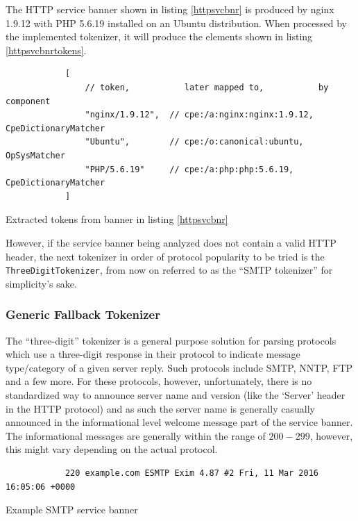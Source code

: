 \documentclass[a4paper,12pt]{article}
\begin{document}
	The HTTP service banner shown in listing \ref{httpsvcbnr} is produced by nginx 1.9.12 with PHP 5.6.19 installed on an Ubuntu distribution. When processed by the implemented tokenizer, it will produce the elements shown in listing \ref{httpsvcbnrtokens}.
	
	\begin{listing}[H]
		\begin{verbatim}
			[
				// token,           later mapped to,           by component
				"nginx/1.9.12",  // cpe:/a:nginx:nginx:1.9.12, CpeDictionaryMatcher
				"Ubuntu",        // cpe:/o:canonical:ubuntu,   OpSysMatcher
				"PHP/5.6.19"     // cpe:/a:php:php:5.6.19,     CpeDictionaryMatcher
			]
		\end{verbatim}
		\caption{Extracted tokens from banner in listing \ref{httpsvcbnr}}
		\label{httpsvcbnrtokens}
	\end{listing}
	
	However, if the service banner being analyzed does not contain a valid HTTP header, the next tokenizer in order of protocol popularity to be tried is the \texttt{ThreeDigitTokenizer}, from now on referred to as the ``SMTP tokenizer'' for simplicity's sake.

\subsubsection{Generic Fallback Tokenizer}
 
	
	The ``three-digit'' tokenizer is a general purpose solution for parsing protocols which use a three-digit response in their protocol to indicate message type/category of a given server reply. Such protocols include SMTP, NNTP, FTP and a few more. For these protocols, however, unfortunately, there is no standardized way to announce server name and version (like the `Server' header in the HTTP protocol) and as such the server name is generally casually announced in the informational level welcome message part of the service banner. The informational messages are generally within the range of $200-299$, however, this might vary depending on the actual protocol.
	
	\begin{listing}[H]
		\begin{verbatim}
			220 example.com ESMTP Exim 4.87 #2 Fri, 11 Mar 2016 16:05:06 +0000
		\end{verbatim}
		\caption{Example SMTP service banner}
		\label{smtpsvcbnr}
	\end{listing}
		
\end{document}
